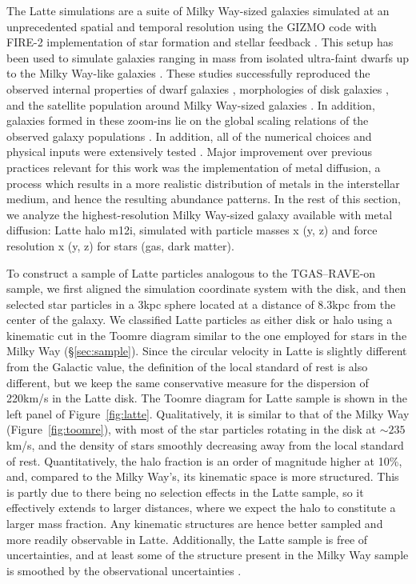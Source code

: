 \documentclass[apj, twocolappendix, numberedappendix, appendixfloats]{emulateapj}
\begin{document}
The Latte simulations are a suite of Milky Way-sized galaxies simulated at an unprecedented spatial and temporal resolution using the GIZMO code \citep{hopkins2015} with FIRE-2 implementation of star formation and stellar feedback \citep[Feedback In Realistic Environments,][]{hopkins2017}.
This setup has been used to simulate galaxies ranging in mass from isolated ultra-faint dwarfs \citep{wheeler2015} up to the Milky Way-like galaxies \citep{wetzel2016}.
These studies successfully reproduced the observed internal properties of dwarf galaxies \citep{elbadry2016}, morphologies of disk galaxies \citep{ma2016}, and the satellite population around Milky Way-sized galaxies \citep{wetzel2016}.
In addition, galaxies formed in these zoom-ins lie on the global scaling relations of the observed galaxy populations \citep{hopkins2014, feldmann2016}.
In addition, all of the numerical choices and physical inputs were extensively tested \citep{hopkins2017}.
Major improvement over previous practices relevant for this work was the implementation of metal diffusion, a process which results in a more realistic distribution of metals in the interstellar medium, and hence the resulting abundance patterns.
In the rest of this section, we analyze the highest-resolution Milky Way-sized galaxy available with metal diffusion: Latte halo m12i, simulated with particle masses x (y, z) and force resolution x (y, z) for stars (gas, dark matter).

To construct a sample of Latte particles analogous to the TGAS--RAVE-on sample, we first aligned the simulation coordinate system with the disk, and then selected star particles in a 3\;kpc sphere located at a distance of 8.3\;kpc from the center of the galaxy.
We classified Latte particles as either disk or halo using a kinematic cut in the Toomre diagram similar to the one employed for stars in the Milky Way (\S\ref{sec:sample}).
Since the circular velocity in Latte is slightly different from the Galactic value, the definition of the local standard of rest is also different, but we keep the same conservative measure for the dispersion of 220\;km/s in the Latte disk.
The Toomre diagram for Latte sample is shown in the left panel of Figure~\ref{fig:latte}.
Qualitatively, it is similar to that of the Milky Way (Figure~\ref{fig:toomre}), with most of the star particles rotating in the disk at $\sim235$\;km/s, and the density of stars smoothly decreasing away from the local standard of rest.
Quantitatively, the halo fraction is an order of magnitude higher at 10\%, and, compared to the Milky Way's, its kinematic space is more structured.
This is partly due to there being no selection effects in the Latte sample, so it effectively extends to larger distances, where we expect the halo to constitute a larger mass fraction.
Any kinematic structures are hence better sampled and more readily observable in Latte.
Additionally, the Latte sample is free of uncertainties, and at least some of the structure present in the Milky Way sample is smoothed by the observational uncertainties \citep[see, e.g.,][]{sanderson2015}.
\end{document}

